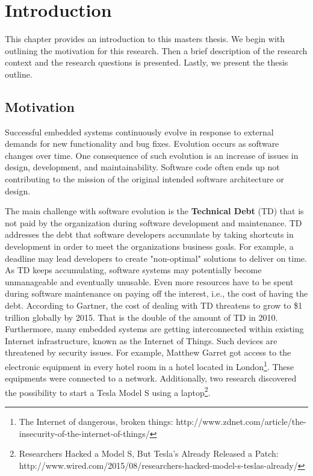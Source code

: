 
\chapter{Introduction}
\label{chap:intro}


This chapter provides an introduction to this masters thesis. We begin with outlining the motivation for this research. Then a brief description of the research context and the research questions is presented. Lastly, we present the thesis outline. 


\section{Motivation}
Successful embedded systems continuously evolve in response to external demands for new functionality and bug fixes\cite{graaf2003embedded}. Evolution occurs as software changes over time. One consequence of such evolution is an increase of issues in design, development, and maintainability\cite{7381510}. Software code often ends up not contributing to the mission of the original intended software architecture or design. 

The main challenge with software evolution is the \textbf{Technical Debt} (TD) that is not paid by the organization during software development and maintenance. TD addresses the debt that software developers accumulate by taking shortcuts in development in order to meet the organizations business goals. For example, a deadline may lead developers to create "non-optimal" solutions to deliver on time. As TD keeps accumulating, software systems may potentially become unmanageable and eventually unusable. Even more resources have to be spent during software maintenance on paying off the interest, i.e., the cost of having the debt. According to Gartner\cite{gartner2010}, the cost of dealing with TD threatens to grow to \$1 trillion globally by 2015. That is the double of the amount of TD in 2010. Furthermore, many embedded systems are getting interconnected within existing Internet infrastructure, known as the Internet of Things. Such devices are threatened by security issues. For example, Matthew Garret got access to the electronic equipment in every hotel room in a hotel located in London\footnote{The Internet of dangerous, broken things: http://www.zdnet.com/article/the-insecurity-of-the-internet-of-things/}. These equipments were connected to a network. Additionally, two research discovered the possibility to start a Tesla Model S using a laptop\footnote{Researchers Hacked a Model S, But Tesla's Already Released a Patch: http://www.wired.com/2015/08/researchers-hacked-model-s-teslas-already/}.

